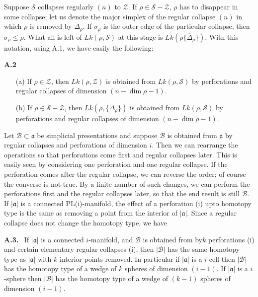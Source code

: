 Suppose $\mathscr{S}$ collapses regularly $(n)$ to $\mathscr{Z}$. If $\rho\in\mathscr{S}-\mathscr{Z}$, $\rho$ has to disappear in some collapse; let us denote the major simplex of the regular collapse $(n)$ in which $\rho$ is removed by $\Delta_{\rho}$. If $\sigma_{\rho}$ is the outer edge of the particular collapse, then $\sigma_{\rho}\leq \rho$. What all is left of $Lk(\rho,\mathscr{S})$ at this stage is $Lk(\rho\{\overline{\Delta}_{\rho}\})$. With this notation, using A.1, we have easily the following:

\medskip
\noindent
{\bf A.2}
\begin{itemize}
\item[(a)] If $\rho\in\mathscr{Z}$, then $Lk(\rho,\mathscr{Z})$ is obtained from $Lk(\rho,\mathscr{S})$ by perforations and regular collapses of dimension $(n-\dim\rho-1)$.

\item[(b)] If $\rho\in\mathscr{S}-\mathscr{Z}$, then $Lk(\rho,\{\overline{\Delta}_{\rho}\})$ is obtained from $Lk(\rho,\mathscr{S})$ by perforations and regular collapses of dimension $(n-\dim\rho-1)$.
\end{itemize}

Let $\mathscr{B}\subset\mathfrak{a}$ be simplicial presentations and suppose $\mathscr{B}$ is obtained from $\mathfrak{a}$ by regular collapses and perforations of dimension $i$. Then we can rearrange the operations so that perforations come first and regular collapses later. This is easily seen by considering one perforation and one regular collapse. If the perforation comes after the regular collapse, we can reverse the order; of course the converse is not true. By a finite number of such changes, we can perform the perforations first and the regular collapses later, so that the end result is still $\mathscr{B}$. If $|\mathfrak{a}|$ is a connected PL(i)-manifold, the effect of a perforation (i) upto homotopy type is the same as removing a point from the interior of $|\mathfrak{a}|$. Since a regular collapse does not change the homotopy type, we have

\medskip
\noindent
{\bf A.3.}~ If $|\mathfrak{a}|$ is a connected $i$-manifold, and $\mathscr{B}$ is obtained from by\pageoriginale $k$ perforations (i) and certain elementary regular collapses (i), then $|\mathscr{B}|$ has the same homotopy type as $|\mathfrak{a}|$ with $k$ interior points removed. In particular if $|\mathfrak{a}|$ is a $i$-cell then $|\mathscr{B}|$ has the homotopy type of a wedge of $k$ spheres of dimension $(i-1)$. If $|\mathfrak{a}|$ is a $i$-sphere then $|\mathscr{B}|$ has the homotopy type of a wedge of $(k-1)$ spheres of dimension $(i-1)$.

